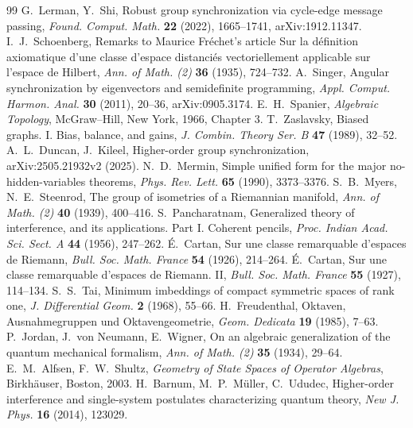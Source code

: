 \documentclass[11pt,reqno]{amsart}
\theoremstyle{definition}
\theoremstyle{remark}
\numberwithin{equation}{section}
\begin{document}
\begin{thebibliography}{99}
 G.~Lerman, Y.~Shi, Robust group synchronization via cycle-edge message passing, \emph{Found. Comput. Math.} \textbf{22} (2022), 1665--1741, arXiv:1912.11347.
 I.~J.~Schoenberg, Remarks to Maurice Fr\'echet's article {Sur la d\'efinition axiomatique d'une classe d'espace distanci\'es vectoriellement applicable sur l'espace de Hilbert}, \emph{Ann. of Math. (2)} \textbf{36} (1935), 724--732.
 A.~Singer, Angular synchronization by eigenvectors and semidefinite programming, \emph{Appl. Comput. Harmon. Anal.} \textbf{30} (2011), 20--36, arXiv:0905.3174.
 E.~H.~Spanier, \emph{Algebraic Topology}, McGraw--Hill, New York, 1966, Chapter 3.
 T.~Zaslavsky, Biased graphs. I. Bias, balance, and gains, \emph{J. Combin. Theory Ser. B} \textbf{47} (1989), 32--52.
 A.~L.~Duncan, J.~Kileel, Higher-order group synchronization, arXiv:2505.21932v2 (2025).
 N.~D.~Mermin, Simple unified form for the major no-hidden-variables theorems, \emph{Phys. Rev. Lett.} \textbf{65} (1990), 3373--3376.
 S.~B.~Myers, N.~E.~Steenrod, The group of isometries of a Riemannian manifold, \emph{Ann. of Math. (2)} \textbf{40} (1939), 400--416.
 S.~Pancharatnam, Generalized theory of interference, and its applications. Part I. Coherent pencils, \emph{Proc. Indian Acad. Sci. Sect. A} \textbf{44} (1956), 247--262.
 \'E.~Cartan, Sur une classe remarquable d'espaces de Riemann, \emph{Bull. Soc. Math. France} \textbf{54} (1926), 214--264.
 \'E.~Cartan, Sur une classe remarquable d'espaces de Riemann. II, \emph{Bull. Soc. Math. France} \textbf{55} (1927), 114--134.
 S.~S.~Tai, Minimum imbeddings of compact symmetric spaces of rank one, \emph{J. Differential Geom.} \textbf{2} (1968), 55--66.
 H.~Freudenthal, Oktaven, Ausnahmegruppen und Oktavengeometrie, \emph{Geom. Dedicata} \textbf{19} (1985), 7--63.
 P.~Jordan, J.~von Neumann, E.~Wigner, On an algebraic generalization of the quantum mechanical formalism, \emph{Ann. of Math. (2)} \textbf{35} (1934), 29--64.
 E.~M.~Alfsen, F.~W.~Shultz, \emph{Geometry of State Spaces of Operator Algebras}, Birkh\"auser, Boston, 2003.
 H.~Barnum, M.~P.~M\"uller, C.~Ududec, Higher-order interference and single-system postulates characterizing quantum theory, \emph{New J. Phys.} \textbf{16} (2014), 123029.

\end{thebibliography}
\end{document}

